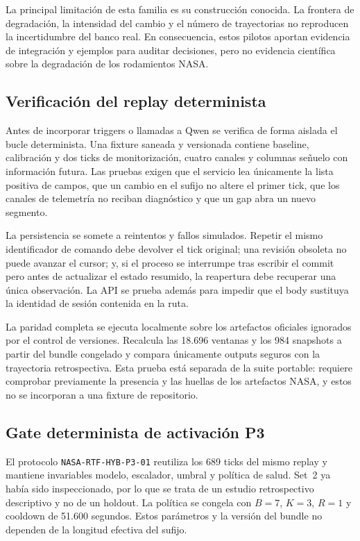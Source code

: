 La principal limitación de esta familia es su construcción conocida. La
frontera de degradación, la intensidad del cambio y el número de trayectorias
no reproducen la incertidumbre del banco real. En consecuencia, estos pilotos
aportan evidencia de integración y ejemplos para auditar decisiones, pero no
evidencia científica sobre la degradación de los rodamientos NASA\@.

\subsection{Verificación del replay determinista}

Antes de incorporar triggers o llamadas a Qwen se verifica de forma aislada el
bucle determinista. Una fixture saneada y versionada contiene baseline,
calibración y dos ticks de monitorización, cuatro canales y columnas señuelo
con información futura. Las pruebas exigen que el servicio lea únicamente la
lista positiva de campos, que un cambio en el sufijo no altere el primer tick,
que los canales de telemetría no reciban diagnóstico y que un gap abra un nuevo
segmento.

La persistencia se somete a reintentos y fallos simulados. Repetir el mismo
identificador de comando debe devolver el tick original; una revisión obsoleta
no puede avanzar el cursor; y, si el proceso se interrumpe tras escribir el
commit pero antes de actualizar el estado resumido, la reapertura debe recuperar
una única observación. La API se prueba además para impedir que el body sustituya
la identidad de sesión contenida en la ruta.

La paridad completa se ejecuta localmente sobre los artefactos oficiales
ignorados por el control de versiones. Recalcula las 18.696 ventanas y los 984
snapshots a partir del bundle congelado y compara únicamente outputs seguros con
la trayectoria retrospectiva. Esta prueba está separada de la suite portable:
requiere comprobar previamente la presencia y las huellas de los artefactos
NASA, y estos no se incorporan a una fixture de repositorio.

\subsection{Gate determinista de activación P3}

El protocolo \texttt{NASA-RTF-HYB-P3-01} reutiliza los 689 ticks del mismo
replay y mantiene invariables modelo, escalador, umbral y política de salud.
Set~2 ya había sido inspeccionado, por lo que se trata de un estudio
retrospectivo descriptivo y no de un holdout. La política se congela con
$B=7$, $K=3$, $R=1$ y cooldown de 51.600 segundos. Estos parámetros y la
versión del bundle no dependen de la longitud efectiva del sufijo.

